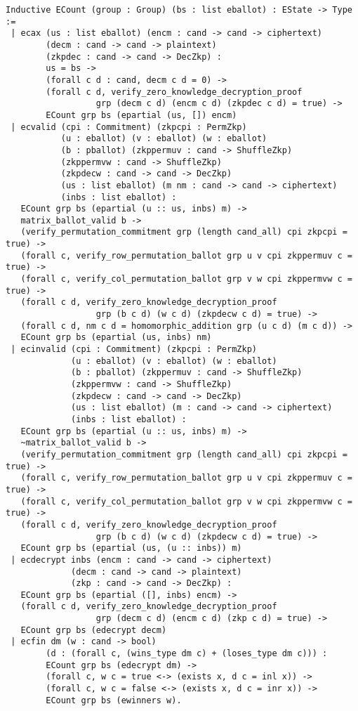 \documentclass{llncs}
\begin{document}
\begin{verbatim}
Inductive ECount (group : Group) (bs : list eballot) : EState -> Type :=
 | ecax (us : list eballot) (encm : cand -> cand -> ciphertext)
        (decm : cand -> cand -> plaintext)
        (zkpdec : cand -> cand -> DecZkp) :
        us = bs ->
        (forall c d : cand, decm c d = 0) -> 
        (forall c d, verify_zero_knowledge_decryption_proof 
                  grp (decm c d) (encm c d) (zkpdec c d) = true) ->
        ECount grp bs (epartial (us, []) encm)
 | ecvalid (cpi : Commitment) (zkpcpi : PermZkp)
           (u : eballot) (v : eballot) (w : eballot)
           (b : pballot) (zkppermuv : cand -> ShuffleZkp)
           (zkppermvw : cand -> ShuffleZkp) 
           (zkpdecw : cand -> cand -> DecZkp)
           (us : list eballot) (m nm : cand -> cand -> ciphertext)
           (inbs : list eballot) :
   ECount grp bs (epartial (u :: us, inbs) m) ->
   matrix_ballot_valid b ->
   (verify_permutation_commitment grp (length cand_all) cpi zkpcpi = true) ->
   (forall c, verify_row_permutation_ballot grp u v cpi zkppermuv c = true) ->
   (forall c, verify_col_permutation_ballot grp v w cpi zkppermvw c = true) ->
   (forall c d, verify_zero_knowledge_decryption_proof 
                  grp (b c d) (w c d) (zkpdecw c d) = true) ->
   (forall c d, nm c d = homomorphic_addition grp (u c d) (m c d)) -> 
   ECount grp bs (epartial (us, inbs) nm)
 | ecinvalid (cpi : Commitment) (zkpcpi : PermZkp)
             (u : eballot) (v : eballot) (w : eballot)
             (b : pballot) (zkppermuv : cand -> ShuffleZkp)
             (zkppermvw : cand -> ShuffleZkp) 
             (zkpdecw : cand -> cand -> DecZkp)
             (us : list eballot) (m : cand -> cand -> ciphertext)
             (inbs : list eballot) :
   ECount grp bs (epartial (u :: us, inbs) m) ->
   ~matrix_ballot_valid b ->
   (verify_permutation_commitment grp (length cand_all) cpi zkpcpi = true) ->
   (forall c, verify_row_permutation_ballot grp u v cpi zkppermuv c = true) ->
   (forall c, verify_col_permutation_ballot grp v w cpi zkppermvw c = true) ->
   (forall c d, verify_zero_knowledge_decryption_proof 
                  grp (b c d) (w c d) (zkpdecw c d) = true) ->
   ECount grp bs (epartial (us, (u :: inbs)) m)
 | ecdecrypt inbs (encm : cand -> cand -> ciphertext)
             (decm : cand -> cand -> plaintext)
             (zkp : cand -> cand -> DecZkp) :
   ECount grp bs (epartial ([], inbs) encm) ->
   (forall c d, verify_zero_knowledge_decryption_proof
                  grp (decm c d) (encm c d) (zkp c d) = true) ->
   ECount grp bs (edecrypt decm)
 | ecfin dm (w : cand -> bool) 
        (d : (forall c, (wins_type dm c) + (loses_type dm c))) :
        ECount grp bs (edecrypt dm) ->
        (forall c, w c = true <-> (exists x, d c = inl x)) ->
        (forall c, w c = false <-> (exists x, d c = inr x)) ->
        ECount grp bs (ewinners w). 
\end{verbatim}
\end{document}
